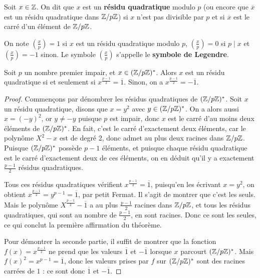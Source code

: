 \begin{defn}

Soit $x \in \mathbb Z$. On dit que $x$ est un \textbf{r\'esidu quadratique} modulo $p$ (ou encore que $\overline{x}$ est un r\'esidu quadratique dans $\mathbb Z/p\mathbb Z$) si $x$ n'est pas divisible par $p$ et si $\overline{x}$ est le carr\'e d'un \'el\'ement de $\mathbb Z/p\mathbb Z$.

\smallskip

On note $\displaystyle \left (\frac{x}{p} \right) = 1$ si $x$ est un r\'esidu quadratique modulo $p$, $\displaystyle \left (\frac{x}{p} \right) = 0$ si $p \mid x$ et $\displaystyle \left (\frac{x}{p} \right) = - 1$ sinon. Le symbole $\displaystyle \left (\frac{x}{p} \right)$ s'appelle le \textbf{symbole de Legendre}.

\end{defn}

\medskip

\begin{thm}

Soit $p$ un nombre premier impair, et $x \in (\mathbb Z/p\mathbb Z)^*$. Alors $x$ est un r\'esidu quadratique si et seulement si $x^{\frac{p - 1}{2}} = \overline{1}$. Sinon, on a $x^{\frac{p - 1}{2}} = - \overline{1}$.

\end{thm}

\begin{proof}

Commen\c cons par d\'enombrer les r\'esidus quadratiques de $(\mathbb Z/p\mathbb Z)^*$. Soit $x$ un r\'esidu quadratique, disons que $x = y^2$ avec $y \in (\mathbb Z/p\mathbb Z)^*$. On a alors aussi $x = (-y)^2$, or $y \neq -y$ puisque $p$ est impair, donc $x$ est le carr\'e d'au moins deux \'el\'ements de $(\mathbb Z/p\mathbb Z)^*$. En fait, c'est le carr\'e d'exactement deux \'el\'ements, car le polyn\^ome $X^2 - x$ est de degr\'e 2, donc admet au plus deux racines dans $\mathbb Z/p\mathbb Z$. Puisque $(\mathbb Z/p\mathbb Z)^*$ poss\`ede $p - 1$ \'el\'ements, et puisque chaque r\'esidu quadratique est le carr\'e d'exactement deux de ces \'el\'ements, on en d\'eduit qu'il y a exactement $\frac{p - 1}{2}$ r\'esidus quadratiques.

\smallskip

Tous ces r\'esidus quadratiques v\'erifient $x^{\frac{p - 1}{2}} = \overline{1}$, puisqu'en les \'ecrivant $x = y^2$, on obtient $x^{\frac{p - 1}{2}} = y^{p - 1} = \overline{1}$, par petit Fermat. Il s'agit de montrer que c'est les seuls. Mais le polyn\^ome $X^{\frac{p - 1}{2}} - \overline{1}$ a au plus $\frac{p - 1}{2}$ racines dans $\mathbb Z/p\mathbb Z$, et tous les r\'esidus quadratiques, qui sont au nombre de $\frac{p - 1}{2}$, en sont racines. Donc ce sont les seules, ce qui conclut la premi\`ere affirmation du th\'eor\`eme.

\smallskip

Pour d\'emontrer la seconde partie, il suffit de montrer que la fonction $f(x) = x^{\frac{p - 1}{2}}$ ne prend que les valeurs $\overline{1}$ et $- \overline{1}$ lorsque $x$ parcourt $(\mathbb Z / p\mathbb Z)^*$. Mais $f(x)^2 = x^{p - 1} = \overline{1}$, donc les valeurs prises par $f$ sur $(\mathbb Z / p\mathbb Z)^*$ sont des racines carr\'ees de $1$ : ce sont donc $\overline{1}$ et $- \overline{1}$.

\end{proof}

